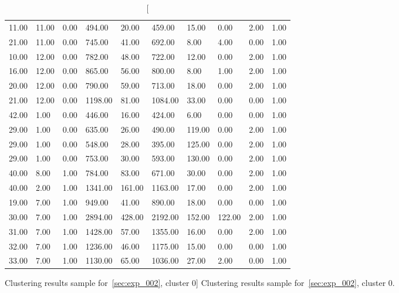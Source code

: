 \begin{table}[h!]
\begin{tabular}{| l l l l l l l l l l |}
        11.00 & 11.00 & 0.00 & 494.00 & 20.00 & 459.00 & 15.00 & 0.00 & 2.00 & 1.00 \\
        21.00 & 11.00 & 0.00 & 745.00 & 41.00 & 692.00 & 8.00 & 4.00 & 0.00 & 1.00 \\
        10.00 & 12.00 & 0.00 & 782.00 & 48.00 & 722.00 & 12.00 & 0.00 & 2.00 & 1.00 \\
        16.00 & 12.00 & 0.00 & 865.00 & 56.00 & 800.00 & 8.00 & 1.00 & 2.00 & 1.00 \\
        20.00 & 12.00 & 0.00 & 790.00 & 59.00 & 713.00 & 18.00 & 0.00 & 2.00 & 1.00 \\
        21.00 & 12.00 & 0.00 & 1198.00 & 81.00 & 1084.00 & 33.00 & 0.00 & 0.00 & 1.00 \\
        42.00 & 1.00 & 0.00 & 446.00 & 16.00 & 424.00 & 6.00 & 0.00 & 0.00 & 1.00 \\
        29.00 & 1.00 & 0.00 & 635.00 & 26.00 & 490.00 & 119.00 & 0.00 & 2.00 & 1.00 \\
        29.00 & 1.00 & 0.00 & 548.00 & 28.00 & 395.00 & 125.00 & 0.00 & 2.00 & 1.00 \\
        29.00 & 1.00 & 0.00 & 753.00 & 30.00 & 593.00 & 130.00 & 0.00 & 2.00 & 1.00 \\
        40.00 & 8.00 & 1.00 & 784.00 & 83.00 & 671.00 & 30.00 & 0.00 & 2.00 & 1.00 \\
        40.00 & 2.00 & 1.00 & 1341.00 & 161.00 & 1163.00 & 17.00 & 0.00 & 2.00 & 1.00 \\
        19.00 & 7.00 & 1.00 & 949.00 & 41.00 & 890.00 & 18.00 & 0.00 & 0.00 & 1.00 \\
        30.00 & 7.00 & 1.00 & 2894.00 & 428.00 & 2192.00 & 152.00 & 122.00 & 2.00 & 1.00 \\
        31.00 & 7.00 & 1.00 & 1428.00 & 57.00 & 1355.00 & 16.00 & 0.00 & 2.00 & 1.00 \\
        32.00 & 7.00 & 1.00 & 1236.00 & 46.00 & 1175.00 & 15.00 & 0.00 & 0.00 & 1.00 \\
        33.00 & 7.00 & 1.00 & 1130.00 & 65.00 & 1036.00 & 27.00 & 2.00 & 0.00 & 1.00 \\
        \hline
    \end{tabular}

    \caption
        [Clustering results sample for~\ref{sec:exp_002}, cluster 0]
        {Clustering results sample for~\ref{sec:exp_002}, cluster 0.}

    \label{tab:exp_002_cluster_0}
\end{table}

